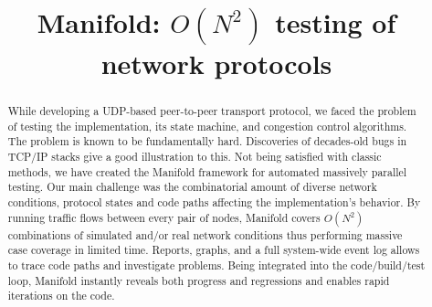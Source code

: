 \documentclass[conference]{IEEEtran}
\begin{document}
\title{Manifold: $O(N^2)$ testing of network protocols}

\author{
\and
{}
\and
{}
}

\maketitle

\begin{abstract}
While developing a UDP-based peer-to-peer transport protocol, we faced the problem of testing the implementation, its state machine, and congestion control algorithms. The problem is known to be fundamentally hard. Discoveries of decades-old bugs in TCP/IP stacks give a good illustration to this. Not being satisfied with classic methods, we have created the Manifold framework for automated massively parallel testing. Our main challenge was the combinatorial amount of diverse network conditions, protocol states and code paths affecting the implementation's behavior. By running traffic flows between every pair of nodes, Manifold covers $O(N^2)$ combinations of simulated and/or real network conditions thus performing massive case coverage in limited time. Reports, graphs, and a full system-wide event log allows to trace code paths and investigate problems. Being integrated into the code/build/test loop, Manifold instantly reveals both progress and regressions and enables rapid iterations on the code.
\end{abstract}
\end{document}
